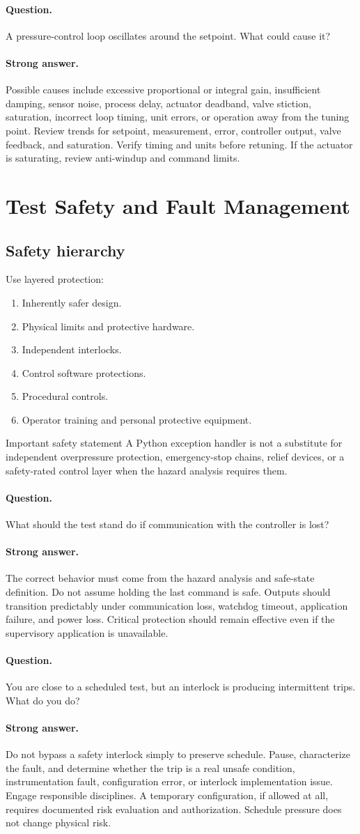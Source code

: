 \documentclass[11pt]{article}
\newcommand{\q}[1]{\paragraph{Question.} #1}
\newcommand{\ans}[1]{\paragraph{Strong answer.} #1}
\begin{document}
\q{A pressure-control loop oscillates around the setpoint. What could cause it?}
\ans{Possible causes include excessive proportional or integral gain, insufficient
damping, sensor noise, process delay, actuator deadband, valve stiction,
saturation, incorrect loop timing, unit errors, or operation away from the tuning
point. Review trends for setpoint, measurement, error, controller output, valve
feedback, and saturation. Verify timing and units before retuning. If the
actuator is saturating, review anti-windup and command limits.}

\section{Test Safety and Fault Management}

\subsection{Safety hierarchy}
Use layered protection:
\begin{enumerate}
  \item Inherently safer design.
  \item Physical limits and protective hardware.
  \item Independent interlocks.
  \item Control software protections.
  \item Procedural controls.
  \item Operator training and personal protective equipment.
\end{enumerate}

\begin{warningbox}{Important safety statement}
A Python exception handler is not a substitute for independent overpressure
protection, emergency-stop chains, relief devices, or a safety-rated control
layer when the hazard analysis requires them.
\end{warningbox}

\q{What should the test stand do if communication with the controller is lost?}
\ans{The correct behavior must come from the hazard analysis and safe-state
definition. Do not assume holding the last command is safe. Outputs should
transition predictably under communication loss, watchdog timeout, application
failure, and power loss. Critical protection should remain effective even if the
supervisory application is unavailable.}

\q{You are close to a scheduled test, but an interlock is producing intermittent trips. What do you do?}
\ans{Do not bypass a safety interlock simply to preserve schedule. Pause,
characterize the fault, and determine whether the trip is a real unsafe
condition, instrumentation fault, configuration error, or interlock implementation
issue. Engage responsible disciplines. A temporary configuration, if allowed at
all, requires documented risk evaluation and authorization. Schedule pressure
does not change physical risk.}
\end{document}
